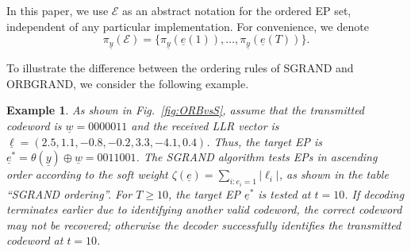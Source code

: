 \documentclass[letterpaper,draftclsnofoot,onecolumn]{IEEEtran}
\newtheorem{example}{Example}
\begin{document}
In this paper, we use $\mathcal{E}$ as an abstract notation for the ordered EP set, independent of any particular implementation. For convenience, we denote
\begin{equation}
\pi_{\underline{y}}(\mathcal{E})
=
\{\pi_{\underline{y}}(\underline{e}(1)),\ldots,\pi_{\underline{y}}(\underline{e}(T))\}.
\end{equation}


To illustrate the difference between the ordering rules of SGRAND and ORBGRAND, we consider the following example.

\begin{example}\label{example:ORB}
    As shown in Fig.~\ref{fig:ORBvsS}, assume that the transmitted codeword is $\underline{w}=0000011$ and the received LLR vector is $\underline{\ell} = (2.5, 1.1, -0.8, -0.2, 3.3, -4.1, 0.4)$. Thus, the target EP is $\underline{e}^* = \theta(\underline{y}) \oplus \underline{w} = 0011001$. The SGRAND algorithm tests EPs in ascending order according to the soft weight $\zeta(\underline{e}) = \sum_{i:e_i=1} |\ell_i|$, as shown in the table ``SGRAND ordering''. For $T \ge 10$, the target EP $\underline{e}^*$ is tested at $t=10$. If decoding terminates earlier due to identifying another valid codeword, the correct codeword may not be recovered; otherwise the decoder successfully identifies the transmitted codeword at $t=10$.


\end{example}
\end{document}
